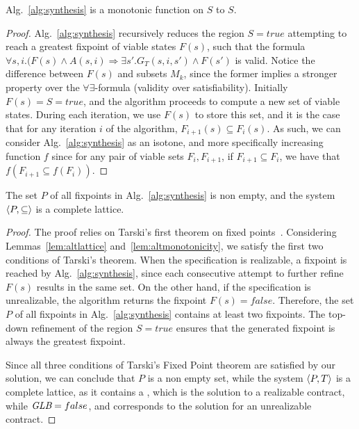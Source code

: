 \begin{lemma} Alg.~\ref{alg:synthesis} is a monotonic function on $S$ to $S$.
\label{lm:altmonotonicity}
\end{lemma}
\begin{proof}
Alg.~\ref{alg:synthesis} recursively reduces the region $S = true$ attempting to reach a greatest fixpoint of viable states $F(s)$, such that the formula $\forall s, i. (F(s) \land A(s,i) \Rightarrow \exists s'. G_T(s,i,s') \land F(s')$ is valid. Notice the difference between $F(s)$ and subsets $M_k$, since the former implies a stronger property over the $\forall\exists$-formula (validity over satisfiability). Initially $F(s) = S = true$, and the algorithm proceeds to compute a new set of viable states. During each iteration, we use $F(s)$ to store this set, and it is the case that for any iteration $i$ of the algorithm, $F_{i+1}(s) \subseteq F_{i}(s)$. As such, we can consider Alg.~\ref{alg:synthesis} as an isotone, and more specifically increasing function $f$ since for any pair of viable sets $F_{i}, F_{i+1}$, if $F_{i+1} \subseteq F_{i}$, we have that $f(F_{i+1} \subseteq f(F_{i}))$.
\end{proof}

\begin{theorem}
The set $P$ of all fixpoints in Alg.~\ref{alg:synthesis} is non
empty, and the system $\langle P, \subseteq \rangle$ is a complete lattice.
\label{thm:altfixpoint}
\end{theorem}
\begin{proof}
The proof relies on Tarski's first theorem on fixed
points~\cite{tarski1955lattice}.
Considering Lemmas~\ref{lem:altlattice} and~\ref{lem:altmonotonicity}, we satisfy the first two
conditions of Tarski's theorem. When the specification is realizable, a
fixpoint is reached by Alg.~\ref{alg:synthesis}, since each consecutive
attempt to further refine $F(s)$ results in the same set. On the other hand, if
the specification is unrealizable, the algorithm returns the fixpoint $F(s) = false$. Therefore, the
set $P$ of all fixpoints in Alg.~\ref{alg:synthesis} contains at least two
fixpoints. The top-down refinement of the region $S = true$ ensures that the generated fixpoint is always the greatest fixpoint.

Since all three conditions of Tarski's Fixed Point theorem are satisfied by our
solution, we can conclude that $P$ is a non empty set, while the system
$\langle P, T \rangle$ is a complete lattice, as it contains a \lub, which is
the solution to a realizable contract, while $\textit {GLB} = false$, and corresponds to
the solution for an unrealizable contract.
\end{proof}

